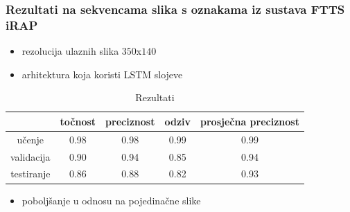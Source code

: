 \documentclass{beamer}
\begin{document}
\begin{frame}
 \frametitle{Rezultati na sekvencama slika s oznakama iz sustava FTTS iRAP}
 \begin{itemize}
  \item rezolucija ulaznih slika $350$x$140$
  \item arhitektura koja koristi LSTM slojeve
 \end{itemize}
 
\begin{table}[H]
\centering
\caption{Rezultati}
\label{score:lstm}
\begin{tabular}{c|c|c|c|c|}
\cline{2-5}
                                            & točnost & preciznost & odziv & prosječna preciznost \\ \hline
\multicolumn{1}{|c|}{učenje}     & 0.98       & 0.98        & 0.99     &           0.99           \\ \hline
\multicolumn{1}{|c|}{validacija} & 0.90       & 0.94        & 0.85     &            0.94          \\ \hline
\multicolumn{1}{|c|}{testiranje} & 0.86       & 0.88        & 0.82     &            0.93          \\ \hline
\end{tabular}
\end{table}

\begin{itemize}
 \item poboljšanje u odnosu na pojedinačne slike
\end{itemize}


\end{frame}
\end{document}
